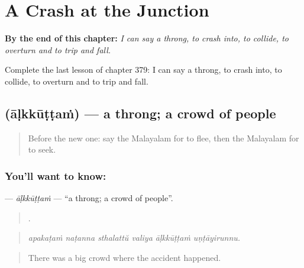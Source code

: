 
\chapter{A Crash at the Junction}
\label{ch:ml-a-crash-at-the-junction}

\begin{chapteropening}
\textbf{By the end of this chapter:} \emph{I can say a throng, to crash into, to collide, to overturn and to trip and fall.}

Complete the last lesson of chapter 379: I can say a throng, to crash into, to collide, to overturn and to trip and fall.
\end{chapteropening}

\section[\texorpdfstring{\ml{ആൾക്കൂട്ടം} (āḷkkūṭṭaṁ)}{ആൾക്കൂട്ടം (āḷkkūṭṭaṁ)}]{ (āḷkkūṭṭaṁ) — a throng; a crowd of people}

\label{lesson:ML-C379-alkkuttam}



\begin{quote}
Before the new one: say the Malayalam for to flee, then the Malayalam for to seek.
\end{quote}

\subsection*{You'll want to know: }
\textbf{} — \emph{āḷkkūṭṭaṁ} — \textquotedblleft{}a throng; a crowd of people\textquotedblright{}.

\begin{quote}
     .
\end{quote}

\begin{quote}
\emph{apakaṭaṁ naṭanna sthalattŭ valiya āḷkkūṭṭaṁ uṇṭāyirunnu.}
\end{quote}

\begin{quote}
There was a big crowd where the accident happened.
\end{quote}

